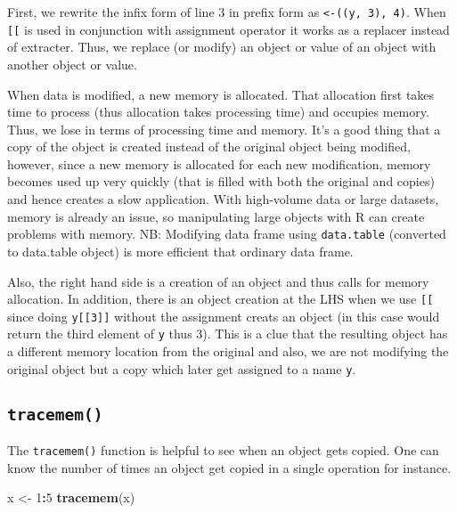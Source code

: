 \documentclass[]{book}
\newenvironment{Shaded}{\begin{snugshade}}{\end{snugshade}}
\newcommand{\DecValTok}[1]{\textcolor[rgb]{0.00,0.00,0.81}{#1}}
\newcommand{\KeywordTok}[1]{\textcolor[rgb]{0.13,0.29,0.53}{\textbf{#1}}}
\newcommand{\NormalTok}[1]{#1}
\newcommand{\OperatorTok}[1]{\textcolor[rgb]{0.81,0.36,0.00}{\textbf{#1}}}
\newcommand{\StringTok}[1]{\textcolor[rgb]{0.31,0.60,0.02}{#1}}
\begin{document}
First, we rewrite the infix form of line 3 in prefix form as \texttt{\textasciigrave{}\textless{}-\textasciigrave{}(\textasciigrave{}{[}{[}\textasciigrave{}(y,\ 3),\ 4)}. When \texttt{{[}{[}} is used in conjunction with assignment operator it works as a replacer instead of extracter. Thus, we replace (or modify) an object or value of an object with another object or value.

When data is modified, a new memory is allocated. That allocation first takes time to process (thus allocation takes processing time) and occupies memory. Thus, we lose in terms of processing time and memory. It's a good thing that a copy of the object is created instead of the original object being modified, however, since a new memory is allocated for each new modification, memory becomes used up very quickly (that is filled with both the original and copies) and hence creates a slow application. With high-volume data or large datasets, memory is already an issue, so manipulating large objects with R can create problems with memory. NB: Modifying data frame using \texttt{data.table} (converted to data.table object) is more efficient that ordinary data frame.

Also, the right hand side is a creation of an object and thus calls for memory allocation. In addition, there is an object creation at the LHS when we use \texttt{{[}{[}} since doing \texttt{y{[}{[}3{]}{]}} without the assignment creats an object (in this case would return the third element of \texttt{y} thus 3). This is a clue that the resulting object has a different memory location from the original and also, we are not modifying the original object but a copy which later get assigned to a name \texttt{y}.

\hypertarget{tracemem}{%
\subsection{\texorpdfstring{\texttt{tracemem()}}{tracemem()}}\label{tracemem}}

The \texttt{tracemem()} function is helpful to see when an object gets copied. One can know the number of times an object get copied in a single operation for instance.

\begin{Shaded}
\begin{Highlighting}[]
\NormalTok{x <-}\StringTok{ }\DecValTok{1}\OperatorTok{:}\DecValTok{5}
\KeywordTok{tracemem}\NormalTok{(x)}
\end{Highlighting}
\end{Shaded}
\end{document}

